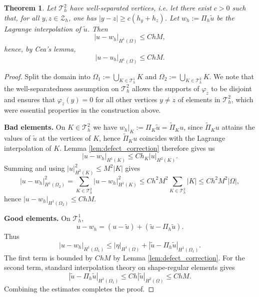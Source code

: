 \documentclass{article}
\newtheorem{theorem}{Theorem}
\begin{document}
\begin{theorem}
Let $\mathcal{T}_h^2$ have well-separated vertices, i.e. let there exist $c>0$ such that, for all $y,z\in \mathcal{Z}_h$, one has $|y-z|\ge c(h_y+h_z)$. Let $w_h:=\Pi_h\widetilde{u}$ be the Lagrange interpolation of $\widetilde{u}$. Then
\[
|u - w_h|_{H^1(\Omega)} \le C h M,
\]
hence, by Cea's lemma,
\[
|u - u_h|_{H^1(\Omega)} \le C h M.
\]
\end{theorem}
\begin{proof}
Split the domain into $\Omega_1 := \bigcup_{K\in \mathcal{T}_h^1} K$ and $\Omega_2 := \bigcup_{K\in \mathcal{T}_h^2} K$. We note that the well-separatedness assumption on $\mathcal{T}_h^2$ allows the supports of $\varphi_z$ to be disjoint and ensures that $\varphi_z(y) = 0$ for all other vertices $y \neq z$ of elements in $\mathcal{T}_h^2$, which were essential properties in the construction above.

\smallskip

\textbf{Bad elements.} On $K \in \mathcal{T}_h^2$ we have $w_h|_K := {\Pi}_K \widetilde{u} = \widetilde{\Pi}_K u$, since $\widetilde{\Pi}_K u$ attains the values of $\widetilde{u}$ at the vertices of $K$, hence $\widetilde{\Pi}_K u$ coincides with the Lagrange interpolation of $K$. Lemma \ref{lem:defect_correction} therefore gives us
\[
|u - w_h|_{H^1(K)} \le C h_K |u|_{H^2(K)}.
\]
Summing and using $|u|_{H^2(K)}^2\leq M^2|K|$ gives
\[
|u - w_h|_{H^1(\Omega_2)}^2=\sum_{K \in \mathcal{T}_h^2} |u - w_h|_{H^1(K)}^2\leq Ch^2M^2\sum_{K \in \mathcal{T}_h^2} |K| 
\le C h^2 M^2|\Omega|,
\]
hence $|u - w_h|_{H^1(\Omega_2)} \le C hM.$

\smallskip

\textbf{Good elements.}
On $\mathcal{T}_h^1$,
\[
u - w_h = (u - \widetilde{u}) + (\widetilde{u} - \Pi_h \widetilde{u}).
\]
Thus
\[
|u - w_h|_{H^1(\Omega_1)}
\le |\eta|_{H^1(\Omega)} + |\widetilde{u} - \Pi_h \widetilde{u}|_{H^1(\Omega_1)}.
\]
The first term is bounded by $C h M$ by Lemma \ref{lem:defect_correction}. For the second term, standard interpolation theory on shape-regular elements gives
\[
|\widetilde{u} - \Pi_h \widetilde{u}|_{H^1(\Omega_1)}
\le C h |\widetilde{u}|_{H^2(\Omega)}
\le C h M.
\]
Combining the estimates completes the proof.
\end{proof}
\end{document}
